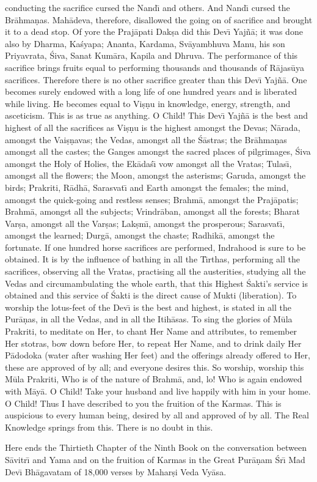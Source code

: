 conducting the sacrifice cursed the Nand\={\i} and others. And Nand\={\i} cursed the Br\=ahma\d{n}as. Mah\=adeva, therefore, disallowed the going on of sacrifice and brought it to a dead stop. Of yore the Praj\=apati Dak\d{s}a did this Dev\={\i} Yaj\~n\=a; it was done also by Dharma, Ka\'syapa; Ananta, Kardama, Sv\=ayambhuva Manu, his son Priyavrata, \'Siva, Sanat Kum\=ara, Kapila and Dhruva. The performance of this sacrifice brings fruits equal to performing thousands and thousands of R\=ajas\=uya sacrifices. Therefore there is no other sacrifice greater than this Dev\={\i} Yaj\~n\=a. One becomes surely endowed with a long life of one hundred years and is liberated while living. He becomes equal to Vi\d{s}\d{n}u in knowledge, energy, strength, and asceticism. This is as true as anything. O Child! This Dev\={\i} Yaj\~n\=a is the best and highest of all the sacrifices as Vi\d{s}\d{n}u is the highest amongst the Devas; N\=arada, amongst the Vai\d{s}\d{n}avas; the Vedas, amongst all the \'S\=astras; the Br\=ahma\d{n}as amongst all the castes; the Ganges amongst the sacred places of pilgrimages, \'Siva amongst the Holy of Holies, the Ek\=ada\'s\={\i} vow amongst all the Vratas; Tulas\={\i}, amongst all the flowers; the Moon, amongst the asterisms; Garuda, amongst the birds; Prakriti, R\=adh\=a, Sarasvat\={\i} and Earth amongst the females; the mind, amongst the quick-going and restless senses; Brahm\=a, amongst the Praj\=apatis; Brahm\=a, amongst all the subjects; Vrindr\=aban, amongst all the forests; Bharat Var\d{s}a, amongst all the Var\d{s}as; Lak\d{s}m\={\i}, amongst the prosperous; Sarasvat\={\i}, amongst the learned; Durg\=a, amongst the chaste; Radhik\=a, amongst the fortunate. If one hundred horse sacrifices are performed, Indrahood is sure to be obtained. It is by the influence of bathing in all the T\={\i}rthas, performing all the sacrifices, observing all the Vratas, practising all the austerities, studying all the Vedas and circumambulating the whole earth, that this Highest \'Sakti's service is obtained and this service of \'Sakti is the direct cause of Mukti (liberation). To worship the lotus-feet of the Dev\={\i} is the best and highest, is stated in all the Pur\=a\d{n}as, in all the Vedas, and in all the Itih\=asas. To sing the glories of M\=ula Prakriti, to meditate on Her, to chant Her Name and attributes, to remember Her stotras, bow down before Her, to repeat Her Name, and to drink daily Her P\=adodoka (water after washing Her feet) and the offerings already offered to Her, these are approved of by all; and everyone desires this. So worship, worship this M\=ula Prakriti, Who is of the nature of Brahm\=a, and, lo! Who is again endowed with M\=ay\=a. O Child! Take your husband and live happily with him in your home. O Child! Thus I have described to you the fruition of the Karmas. This is auspicious to every human being, desired by all and approved of by all. The Real Knowledge springs from this. There is no doubt in this.

Here ends the Thirtieth Chapter of the Ninth Book on the conversation between S\=avitr\={\i} and Yama and on the fruition of Karmas in the Great Pur\=a\d{n}am \'Sr\={\i} Mad Dev\={\i} Bh\=agavatam of 18,000 verses by Mahar\d{s}i Veda Vy\=asa.



